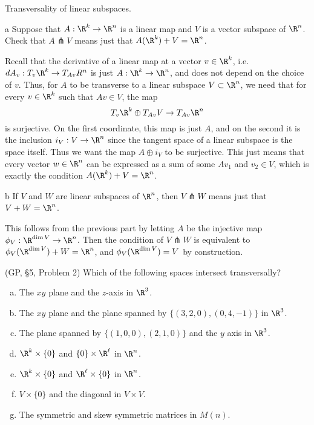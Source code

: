 \documentclass[11pt,letterpaper]{article}
\begin{document}
\begin{solution}
    Transversality of linear subspaces.
    \begin{partproblem}{a}
        Suppose that $A : \R^k \to \R^n$ is a linear map and $V$ is a vector subspace of $\R^n$. Check that $A\pitchfork V$ means just that $A(\R^k) + V = \R^n$.
    \end{partproblem}

    \quad Recall that the derivative of a linear map at a vector $v\in \R^k$, i.e. $dA_v : T_v\R^k \to T_{Av} R^n$ is just $A : \R^k \to \R^n$, and does not depend on the choice of $v$. Thus, for $A$ to be transverse to a linear subspace $V\subset \R^n$, we need that for every $v\in \R^k$ such that $Av\in V$, the map 
    \[
        T_v \R^k \oplus T_{Av} V \to T_{Av}\R^n
    \] 
    is surjective. On the first coordinate, this map is just $A$, and on the second it is the inclusion $i_V : V \to \R^n$ since the tangent space of a linear subspace is the space itself. Thus we want the map $A\oplus i_V$ to be surjective. This just means that every vector $w\in \R^n$ can be expressed as a sum of some $Av_1$ and $v_2\in V$, which is exactly the condition $A(\R^k)+V=\R^n$. 

    \begin{partproblem}{b}
        If $V$ and $W$ are linear subspaces of $\R^n$, then $V\pitchfork W$ means just that $V + W = \R^n$.
    \end{partproblem}
    \quad This follows from the previous part by letting $A$ be the injective map $\phi_V : \R^{\dim V} \to \R^n$. Then the condition of $V\pitchfork W$ is equivalent to $\phi_V(\R^{\dim V}) + W = \R^n$, and $\phi_V(\R^{\dim V}) = V$ by construction.
\end{solution}

\begin{problem}
(GP, \S5, Problem 2) Which of the following spaces intersect transversally?
\begin{enumerate}[(a)]
    \item The $xy$ plane and the $z$-axis in $\R^3$.
    \item The $xy$ plane and the plane spanned by $\{(3,2,0), (0,4,-1)\}$ in $\R^3$.
    \item The plane spanned by $\{(1,0,0), (2,1,0)\}$ and the $y$ axis in $\R^3$.
    \item $\R^k\times \{0\}$ and $\{0\}\times \R^\ell$ in $\R^n$.
    \item $\R^k\times \{0\}$ and $\R^\ell \times \{0\}$ in $\R^n$. 
    \item $V\times \{0\}$ and the diagonal in $V\times V$.
    \item The symmetric and skew symmetric matrices in $M(n)$. 
\end{enumerate}
\end{problem}
\end{document}
